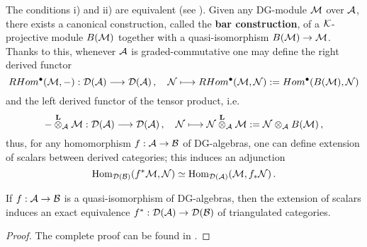 	The conditions i) and ii) are equivalent (see \parencite[Lemma~10.12.2.2]{bernstein-lunts}).
	Given any DG-module $\mathcal{M}$ over $\mathcal{A}$, there exists a canonical construction,
	called the \textbf{bar construction}, of a $\mathcal{K}$-projective module $B(\mathcal{M})$
	together with a quasi-isomorphism $B(\mathcal{M}) \to \mathcal{M}$. 
	Thanks to this, whenever $\mathcal{A}$ is graded-commutative
	one may define the right derived functor
	\begin{equation*}
		RHom^{\bullet}(\mathcal{M},-) : \mathcal{D}(\mathcal{A}) \longrightarrow \mathcal{D}(\mathcal{A})\,,
		\quad \mathcal{N} \longmapsto RHom^{\bullet}(\mathcal{M},\mathcal{N}) := Hom^{\bullet}(B(\mathcal{M}),\mathcal{N})
	\end{equation*}
	and the left derived functor of the tensor product, i.e.
	\begin{equation*}
		- \overset{{\normalfont\textbf{L}}}{\otimes}_{\mathcal{A}} \mathcal{M} : \mathcal{D}(\mathcal{A}) \longrightarrow \mathcal{D}(\mathcal{A})\,,
		\quad \mathcal{N} \longmapsto \mathcal{N} \overset{{\normalfont\textbf{L}}}{\otimes}_{\mathcal{A}} \mathcal{M} := \mathcal{N} \otimes_{\mathcal{A}} B(\mathcal{M})\,,
	\end{equation*}
	thus, for any homomorphism $f:\mathcal{A} \to \mathcal{B}$ of DG-algebras,
	one can define extension of scalars between derived categories;
	this induces an adjunction
	\begin{equation*}
		\operatorname{Hom}_{\mathcal{D}(\mathcal{B})}(f^{*}\mathcal{M},\mathcal{N}) \simeq \operatorname{Hom}_{\mathcal{D}(\mathcal{A})}(\mathcal{M},f_{*}\mathcal{N})\,.
	\end{equation*}
	
	\begin{thm}
		If $f:\mathcal{A} \to \mathcal{B}$ is a quasi-isomorphism of DG-algebras,
		then the extension of scalars induces an exact equivalence
		$f^*: \mathcal{D}(\mathcal{A}) \to \mathcal{D}(\mathcal{B})$ 
		of triangulated categories.
		\begin{proof}
			The complete proof can be found in \parencite[Theorem~10.12.5.1]{bernstein-lunts}.
		\end{proof}
	\end{thm}
	
	
	
	
	
	
	
	
	
	
	
	
	
	
	
	
	